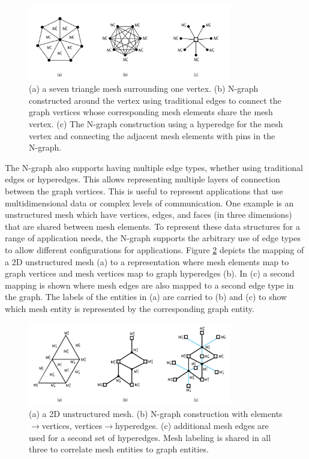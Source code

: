 \begin{figure}[!ht]
  \centering
  \includegraphics[width=3.5in]{edgecounts.png}
  \caption{(a) a seven triangle mesh surrounding one vertex. (b) N-graph constructed around the vertex using traditional edges to connect the graph vertices whose corresponding mesh elements share the mesh vertex. (c) The N-graph construction using a hyperedge for the mesh vertex and connecting the adjacent mesh elements with pins in the N-graph.}
  \label{fig:edgecounts}
\end{figure}

The N-graph also supports having multiple edge types,
whether using traditional edges or hyperedges. This
allows representing multiple layers of connection
between the graph vertices. This is useful to represent
applications that use multidimensional data or complex
levels of communication. One example is an unstructured
mesh which have vertices,
edges, and faces (in three dimensions) that are shared
between mesh elements. To represent these data
structures for a range of application needs, the
N-graph supports the arbitrary use of edge types to allow
different configurations for applications. Figure
\ref{fig:Mesh2Graph} depicts the mapping of a 2D unstructured mesh (a) to a
representation where mesh elements map to graph vertices and mesh vertices map
to graph hyperedges (b). In (c) a second mapping is shown where mesh edges
are also mapped to a second edge type in the graph. The labels of the entities
in (a) are carried to (b) and (c) to show which mesh entity is represented by
the corresponding graph entity.

\begin{figure}[!ht]
  \centering
  \includegraphics[width=3.5in]{exampleMesh2Graph.png}
  \caption{(a) a 2D unstructured mesh. (b) N-graph construction with elements$\rightarrow$vertices, vertices$\rightarrow$hyperedges. (c) additional mesh edges are used for a second set of hyperedges. Mesh labeling is shared in all three to correlate mesh entities to graph entities.}
  \label{fig:Mesh2Graph}
\end{figure}


